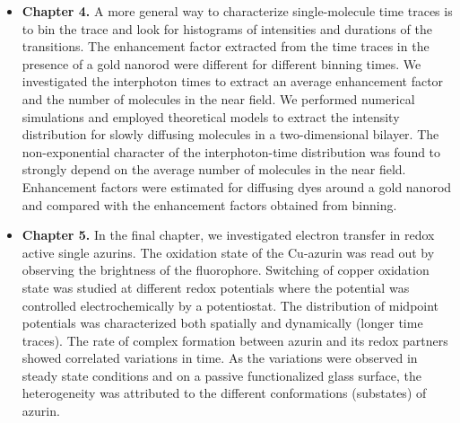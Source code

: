 \begin{itemize}
	\item \textbf{Chapter 4.} A more general way to characterize single-molecule time traces is to bin the trace and look for histograms of intensities and durations of the transitions.
	The enhancement factor extracted from the time traces in the presence of a gold nanorod were different for different binning times.
	We investigated the interphoton times to extract an average enhancement factor and the number of molecules in the near field.
	We performed numerical simulations and employed theoretical models to extract the intensity distribution for slowly diffusing molecules in a two-dimensional bilayer.
	The non-exponential character of the interphoton-time distribution was found to strongly depend on the average number of molecules in the near field.
	Enhancement factors were estimated for diffusing dyes around a gold nanorod and compared with the enhancement factors obtained from binning.

	\item \textbf{Chapter 5.} In the final chapter, we investigated electron transfer in redox active single azurins.
	The oxidation state of the Cu-azurin was read out by observing the brightness of the fluorophore.
	Switching of copper oxidation state was studied at different redox potentials where the potential was controlled electrochemically by a potentiostat.
	The distribution of midpoint potentials was characterized both spatially and dynamically (longer time traces).
	The rate of complex formation between azurin and its redox partners showed correlated variations in time.
	As the variations were observed in steady state conditions and on a passive functionalized glass surface, the heterogeneity was attributed to the different conformations (substates) of azurin.
\end{itemize}
